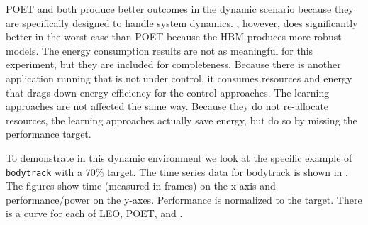 POET and \SYSTEM{} both produce better outcomes in the dynamic
scenario because they are specifically designed to handle system
dynamics.  \SYSTEM{}, however, does significantly better in the worst
case than POET because the HBM produces more robust models.
The energy consumption results are not as meaningful for this
experiment, but they are included for completeness.  Because there is
another application running that is not under control, it consumes
resources and energy that drags down energy efficiency for the control
approaches.  The learning approaches are not affected the same way.
Because they do not re-allocate resources, the learning approaches
actually save energy, but do so by missing the performance target.



To demonstrate \SYSTEM{} in this dynamic environment we look at the
specific example of \texttt{bodytrack} with a 70\% target.  The time
series data for bodytrack is shown in .
The figures show time (measured in frames) on the x-axis and
performance/power on the y-axes.  Performance is normalized to the
target.  There is a curve for each of LEO, POET, and \SYSTEM{}.

